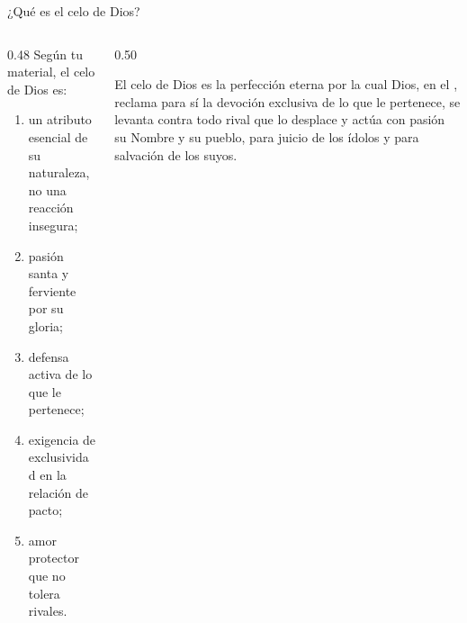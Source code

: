 \begin{frame}{¿Qué es el celo de Dios?}
\begin{columns}[c,onlytextwidth]
\begin{column}{0.48\textwidth}\small
Según tu material, el celo de Dios es:
\begin{enumerate}
\item un atributo esencial de su naturaleza, no una reacción insegura;
\item pasión santa y ferviente por su gloria;
\item defensa activa de lo que le pertenece;
\item exigencia de exclusividad en la relación de pacto;
\item amor protector que no tolera rivales.
\end{enumerate}
\begin{center}\\ \end{center}
\end{column}
\begin{column}{0.50\textwidth}
\begin{tcolorbox}[colback=papiro,colframe=azul,boxrule=1pt,arc=3pt,title={\small Definición},colbacktitle=azul,coltitle=papiro]
\small El celo de Dios es la perfección eterna por la cual Dios, en el , reclama para sí la devoción exclusiva de lo que le pertenece, se levanta contra todo rival que lo desplace y actúa con pasión  su Nombre y  su pueblo, para juicio de los ídolos y para salvación de los suyos.
\end{tcolorbox}
\end{column}
\end{columns}
\end{frame}


